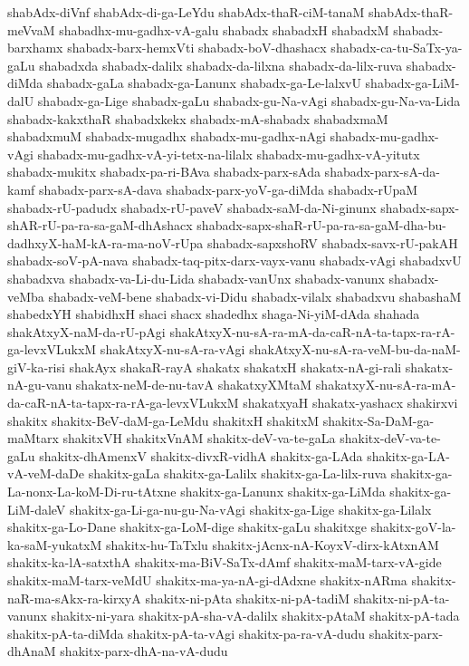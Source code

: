 {shabAdx-diVnf
shabAdx-di-ga-LeYdu
shabAdx-thaR-ciM-tanaM
shabAdx-thaR-meVvaM
shabadhx-mu-gadhx-vA-galu
shabadx
shabadxH
shabadxM
shabadx-barxhamx
shabadx-barx-hemxVti
shabadx-boV-dhashacx
shabadx-ca-tu-SaTx-ya-gaLu
shabadxda
shabadx-dalilx
shabadx-da-lilxna
shabadx-da-lilx-ruva
shabadx-diMda
shabadx-gaLa
shabadx-ga-Lanunx
shabadx-ga-Le-lalxvU
shabadx-ga-LiM-dalU
shabadx-ga-Lige
shabadx-gaLu
shabadx-gu-Na-vAgi
shabadx-gu-Na-va-Lida
shabadx-kakxthaR
shabadxkekx
shabadx-mA-shabadx
shabadxmaM
shabadxmuM
shabadx-mugadhx
shabadx-mu-gadhx-nAgi
shabadx-mu-gadhx-vAgi
shabadx-mu-gadhx-vA-yi-tetx-na-lilalx
shabadx-mu-gadhx-vA-yitutx
shabadx-mukitx
shabadx-pa-ri-BAva
shabadx-parx-sAda
shabadx-parx-sA-da-kamf
shabadx-parx-sA-dava
shabadx-parx-yoV-ga-diMda
shabadx-rUpaM
shabadx-rU-padudx
shabadx-rU-paveV
shabadx-saM-da-Ni-ginunx
shabadx-sapx-shAR-rU-pa-ra-sa-gaM-dhAshacx
shabadx-sapx-shaR-rU-pa-ra-sa-gaM-dha-bu-dadhxyX-haM-kA-ra-ma-noV-rUpa
shabadx-sapxshoRV
shabadx-savx-rU-pakAH
shabadx-soV-pA-nava
shabadx-taq-pitx-darx-vayx-vanu
shabadx-vAgi
shabadxvU
shabadxva
shabadx-va-Li-du-Lida
shabadx-vanUnx
shabadx-vanunx
shabadx-veMba
shabadx-veM-bene
shabadx-vi-Didu
shabadx-vilalx
shabadxvu
shabashaM
shabedxYH
shabidhxH
shaci
shacx
shadedhx
shaga-Ni-yiM-dAda
shahada
shakAtxyX-naM-da-rU-pAgi
shakAtxyX-nu-sA-ra-mA-da-caR-nA-ta-tapx-ra-rA-ga-levxVLukxM
shakAtxyX-nu-sA-ra-vAgi
shakAtxyX-nu-sA-ra-veM-bu-da-naM-giV-ka-risi
shakAyx
shakaR-rayA
shakatx
shakatxH
shakatx-nA-gi-rali
shakatx-nA-gu-vanu
shakatx-neM-de-nu-tavA
shakatxyXMtaM
shakatxyX-nu-sA-ra-mA-da-caR-nA-ta-tapx-ra-rA-ga-levxVLukxM
shakatxyaH
shakatx-yashacx
shakirxvi
shakitx
shakitx-BeV-daM-ga-LeMdu
shakitxH
shakitxM
shakitx-Sa-DaM-ga-maMtarx
shakitxVH
shakitxVnAM
shakitx-deV-va-te-gaLa
shakitx-deV-va-te-gaLu
shakitx-dhAmenxV
shakitx-divxR-vidhA
shakitx-ga-LAda
shakitx-ga-LA-vA-veM-daDe
shakitx-gaLa
shakitx-ga-Lalilx
shakitx-ga-La-lilx-ruva
shakitx-ga-La-nonx-La-koM-Di-ru-tAtxne
shakitx-ga-Lanunx
shakitx-ga-LiMda
shakitx-ga-LiM-daleV
shakitx-ga-Li-ga-nu-gu-Na-vAgi
shakitx-ga-Lige
shakitx-ga-Lilalx
shakitx-ga-Lo-Dane
shakitx-ga-LoM-dige
shakitx-gaLu
shakitxge
shakitx-goV-la-ka-saM-yukatxM
shakitx-hu-TaTxlu
shakitx-jAcnx-nA-KoyxV-dirx-kAtxnAM
shakitx-ka-lA-satxthA
shakitx-ma-BiV-SaTx-dAmf
shakitx-maM-tarx-vA-gide
shakitx-maM-tarx-veMdU
shakitx-ma-ya-nA-gi-dAdxne
shakitx-nARma
shakitx-naR-ma-sAkx-ra-kirxyA
shakitx-ni-pAta
shakitx-ni-pA-tadiM
shakitx-ni-pA-ta-vanunx
shakitx-ni-yara
shakitx-pA-sha-vA-dalilx
shakitx-pAtaM
shakitx-pA-tada
shakitx-pA-ta-diMda
shakitx-pA-ta-vAgi
shakitx-pa-ra-vA-dudu
shakitx-parx-dhAnaM
shakitx-parx-dhA-na-vA-dudu
}
